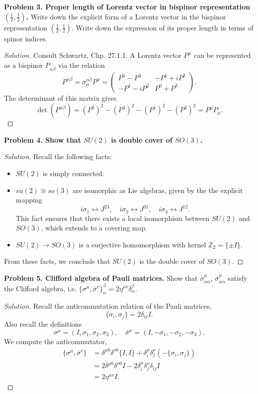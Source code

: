 \textbf{Problem 3. Proper length of Lorentz vector in bispinor representation $(\frac{1}{2}, \frac{1}{2})$.} Write down the explicit form of a Lorentz vector in the bispinor representation $(\frac{1}{2}, \frac{1}{2})$. Write down the expression of its proper length in terms of spinor indices.

\begin{proof}[Solution]
	Consult Schwartz, Chp. 27.1.1. A Lorentz vector $P^\mu$ can be represented as a bispinor $P_{\alpha \dot{\beta}}$ via the relation
	\[
	P^{\alpha \dot{\beta}} = \sigma_\mu ^{\alpha \dot{\beta}} P^\mu
	= \begin{pmatrix}
		P^0 - P^3 & -P^1 + i P^2 \\
		-P^1 - i P^2 & P^0 + P^3
	\end{pmatrix}.
	\]
	The determinant of this matrix gives
	\[
	\det(P^{\alpha \dot{\beta}}) = (P^0)^2 - (P^3)^2 - (P^1)^2 - (P^2)^2 = P^\mu P_\mu.
	\]
\end{proof}

\textbf{Problem 4. Show that $SU(2)$ is double cover of $SO(3)$.} 


\begin{proof}[Solution]
	Recall the following facts:
	\begin{itemize}
		\item $SU(2)$ is simply connected.
		\item $su(2) \cong so(3)$ are isomorphic as Lie algebras, given by the the explicit mapping
		\[
		i \sigma_1 \leftrightarrow J^{23}, \quad
		i \sigma_2 \leftrightarrow J^{31}, \quad
		i \sigma_3 \leftrightarrow J^{12}.
		\]
		This fact ensures that there exists a local isomorphism between $SU(2)$ and $SO(3)$, which extends to a covering map.
		\item $SU(2) \to SO(3)$ is a surjective homomorphism with kernel $\mathbb{Z}_2 = \{\pm I\}$.
	\end{itemize}
	From these facts, we conclude that $SU(2)$ is the double cover of $SO(3)$.
\end{proof}

\textbf{Problem 5. Clifford algebra of Pauli matrices.} Show that $\sigma^\mu_{\alpha \dot{\alpha}}$, $\bar{\sigma}^{\mu}_{\alpha \dot{\alpha}}$ satisfy the Clifford algebra, i.e. $\{\sigma^\mu, \bar{\sigma}^\nu\}_\alpha^{\beta} = 2 \eta^{\mu \nu} \delta_{\alpha}^{\beta}$.

\begin{proof}[Solution]
	Recall the anticommutation relation of the Pauli matrices,
	\[
	\{\sigma_i, \sigma_j\} = 2 \delta_{i j} I.
	\]
	Also recall the definitions
	\[
	\sigma^\mu = (I, \sigma_1, \sigma_2, \sigma_3), \quad
	\bar{\sigma}^\mu = (I, -\sigma_1, -\sigma_2, -\sigma_3).
	\]
	We compute the anticommutator,
	\begin{align*}
		\{\sigma^\mu, \bar{\sigma}^\nu\}
		&= \delta^{\mu 0} \delta^{\nu 0} \{I, I\} + \delta^\mu_i \delta^\nu _j (- \{\sigma_i, \sigma_j\}) \\
		&= 2 \delta^{\mu 0} \delta^{\nu 0} I - 2 \delta^\mu_i \delta^\nu _j \delta_{i j} I \\
		&= 2 \eta^{\mu \nu} I.
	\end{align*}
\end{proof}

